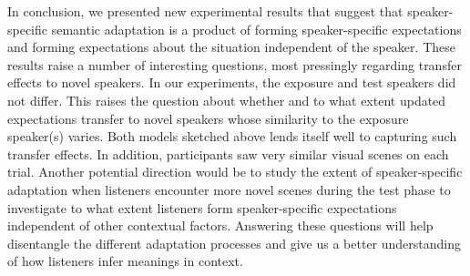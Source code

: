 \documentclass[10pt,letterpaper]{article}
\begin{document}
In conclusion, we presented new experimental results that suggest that speaker-specific semantic adaptation
is a product of forming speaker-specific expectations and forming expectations about the situation independent of the
speaker.
These results raise a number of interesting questions, most pressingly regarding transfer effects to novel speakers. In our experiments, the exposure and test speakers
did not differ. This raises the question about whether and to what extent updated expectations transfer to novel speakers whose similarity to the exposure speaker(s) varies.
Both models sketched above lends itself well to capturing such transfer effects.
In addition, participants saw very similar visual scenes on each trial. Another potential direction would be to study the 
extent of speaker-specific adaptation when listeners encounter more novel scenes during the test phase to investigate to what extent
listeners form speaker-specific expectations independent of other contextual factors.
Answering these
questions will help disentangle the different adaptation processes and give us a better understanding
of how listeners infer meanings in context.




%
%





\setlength{\bibleftmargin}{.125in}
\setlength{\bibindent}{-\bibleftmargin}


\end{document}
